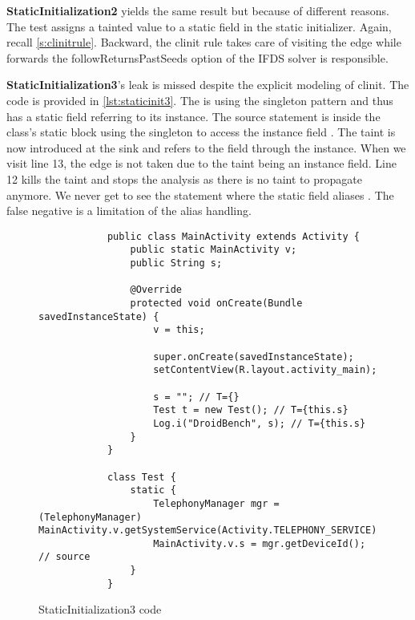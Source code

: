 \documentclass[../draft.tex]{subfiles}
\begin{document}
    \textbf{StaticInitialization2} yields the same result but because of different reasons. The test assigns a tainted value to a static field in the static initializer. Again, recall \autoref{s:clinitrule}. Backward, the clinit rule takes care of visiting the  edge while forwards the followReturnsPastSeeds option of the IFDS solver is responsible.

    \textbf{StaticInitialization3}'s leak is missed despite the explicit modeling of clinit. The code is provided in \autoref{lst:staticinit3}. The  is using the singleton pattern and thus has a static field  referring to its instance. The source statement is inside the  class's static block using the singleton to access the instance field .
    The taint is now introduced at the sink and refers to the field through the  instance. When we visit line 13, the  edge is not taken due to the taint being an instance field. Line 12 kills the taint and stops the analysis as there is no taint to propagate anymore. We never get to see the statement where the static field  aliases .
    The false negative is a limitation of the alias handling.

    \begin{figure}[tbp]
        \begin{lstlisting}
            public class MainActivity extends Activity {
                public static MainActivity v;
                public String s;

                @Override
                protected void onCreate(Bundle savedInstanceState) {
                    v = this;

                    super.onCreate(savedInstanceState);
                    setContentView(R.layout.activity_main);

                    s = ""; // T={}
                    Test t = new Test(); // T={this.s}
                    Log.i("DroidBench", s); // T={this.s}
                }
            }

            class Test {
                static {
                    TelephonyManager mgr = (TelephonyManager) MainActivity.v.getSystemService(Activity.TELEPHONY_SERVICE);
                    MainActivity.v.s = mgr.getDeviceId(); // source
                }
            }
        \end{lstlisting}
        \caption{StaticInitialization3 code}
        \label{lst:staticinit3}
    \end{figure}
\end{document}
